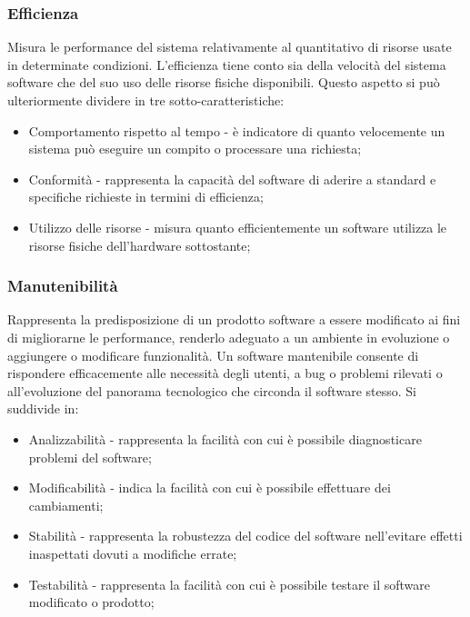 \documentclass[10pt]{article}
\begin{document}
\begin{justify}
        \subsubsection{Efficienza}
        Misura le performance del sistema relativamente al quantitativo di risorse usate in determinate condizioni. L'efficienza tiene conto sia della velocità
        del sistema software che del suo uso delle risorse fisiche disponibili. Questo aspetto si può ulteriormente dividere in tre sotto-caratteristiche:
        \begin{itemize}
            \item Comportamento rispetto al tempo - è indicatore di quanto velocemente un sistema può eseguire un compito o processare una richiesta;
            \item Conformità - rappresenta la capacità del software di aderire a standard e specifiche richieste in termini di efficienza;
            \item Utilizzo delle risorse - misura quanto efficientemente un software utilizza le risorse fisiche dell'hardware sottostante;
        \end{itemize}

        \subsubsection{Manutenibilità}
        Rappresenta la predisposizione di un prodotto software a essere modificato ai fini di migliorarne le performance, renderlo adeguato a un ambiente in evoluzione
        o aggiungere o modificare funzionalità. Un software mantenibile consente di rispondere efficacemente alle necessità degli utenti, a bug o problemi rilevati o
        all'evoluzione del panorama tecnologico che circonda il software stesso. Si suddivide in:
        \begin{itemize}
            \item Analizzabilità - rappresenta la facilità con cui è possibile diagnosticare problemi del software;
            \item Modificabilità - indica la facilità con cui è possibile effettuare dei cambiamenti;
            \item Stabilità - rappresenta la robustezza del codice del software nell'evitare effetti inaspettati dovuti a modifiche errate;
            \item Testabilità - rappresenta la facilità con cui è possibile testare il software modificato o prodotto;
        \end{itemize}


\end{justify}
\end{document}
